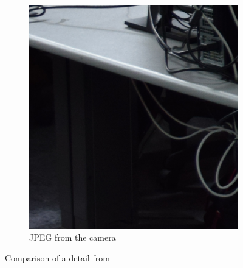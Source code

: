 \documentclass[a4paper,oneside]{article}
\begin{document}
\begin{figure}[htbp]
\begin{subfigure}{.33\textwidth}
  \caption{}
\end{subfigure}%
  \begin{subfigure}{.33\textwidth}
  \centering
  \includegraphics[width=.95\linewidth]{camera_students2_detail}
  \caption{JPEG from the camera}
\end{subfigure}
\caption{Comparison of a detail from }
\label{fig:dark_artifacts}
\end{figure}

\printbibliography
\end{document}
